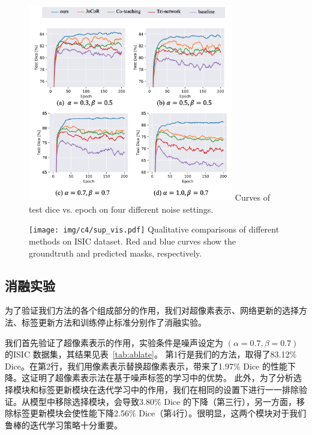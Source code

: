     \begin{figure}[tbp]
        \centering 
        \includegraphics[width=0.8\textwidth]{img/c4/c_test_curve2.png}
        {Curves of test dice vs. epoch on four different noise settings.} %
        \label{fig:test_dice}
    \end{figure}

    \begin{figure}[tbp]
        \centering 
        \texttt{[image: img/c4/sup\_vis.pdf]}
        {Qualitative comparisons of different methods on ISIC dataset. Red and blue curves show the groundtruth and predicted masks, respectively.}
        \label{fig:isic_vis}
    \end{figure}



\subsection{消融实验}
为了验证我们方法的各个组成部分的作用，我们对超像素表示、网络更新的选择方法、标签更新方法和训练停止标准分别作了消融实验。

我们首先验证了超像素表示的作用，实验条件是噪声设定为 $(\alpha=0.7, \beta=0.7)$ 的ISIC 数据集，其结果见表~\ref{tab:ablate}。
第1行是我们的方法，取得了83.12\% Dice。在第2行，我们用像素表示替换超像素表示，带来了1.97\% Dice 的性能下降。这证明了超像素表示法在基于噪声标签的学习中的优势。
此外，为了分析选择模块和标签更新模块在迭代学习中的作用，我们在相同的设置下进行一一排除验证。从模型中移除选择模块，会导致3.80\% Dice 的下降（第三行），另一方面，移除标签更新模块会使性能下降2.56\% Dice（第4行）。很明显，这两个模块对于我们鲁棒的迭代学习策略十分重要。


